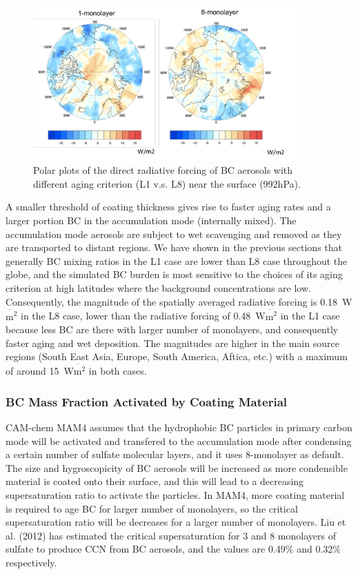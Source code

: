 \documentclass[12pt]{article}
\begin{document}
	\begin{figure}[H] 
		\begin{center}
			\includegraphics[width = 0.9\textwidth]{Figure22}
			\caption[]{\label{fig_P22} Polar plots of the direct radiative forcing of BC aerosols with different aging criterion (L1 v.s. L8) near the surface (992hPa).}
		\end{center}
	\end{figure}
	A smaller threshold of coating thickness gives rise to faster aging rates and a larger portion BC in the accumulation mode (internally mixed). The accumulation mode aerosols are subject to wet scavenging and removed as they are transported to distant regions. We have shown in the previous sections that generally BC mixing ratios in the L1 case are lower than L8 case throughout the globe, and the simulated BC burden is most sensitive to the choices of its aging criterion at high latitudes where the background concentrations are low. Consequently, the magnitude of the spatially averaged radiative forcing is 0.18~W$\dot{\text{m}^2}$ in the L8 case, lower than the radiative forcing of 0.48~W$\dot{\text{m}^2}$ in the L1 case because less BC are there with larger number of monolayers, and consequently faster aging and wet deposition. The magnitudes are higher in the main source regions (South East Asia, Europe, South America, Aftica, etc.) with a maximum of around 15~W$\dot{\text{m}^2}$ in both cases. 
	


	
	
	\subsubsection{BC Mass Fraction Activated by Coating Material}
	CAM-chem MAM4 assumes that the hydrophobic BC particles in  primary carbon mode will be activated and transfered to the accumulation mode after condensing a certain number of sulfate molecular layers, and it uses 8-monolayer as default. The size and hygroscopicity of BC aerosols will be increased as more condensible material is coated onto their surface, and this will lead to a decreasing supersaturation ratio to activate the particles. In MAM4, more coating material is required to age BC for larger number of monolayers, so the critical supersaturation ratio will be decreases for a larger number of monolayers. Liu et al. (2012) has estimated the critical supersaturation for 3 and 8 monolayers of sulfate to produce CCN from BC aerosols, and the values are 0.49$\%$ and 0.32$\%$ respectively. 
	
\end{document}

